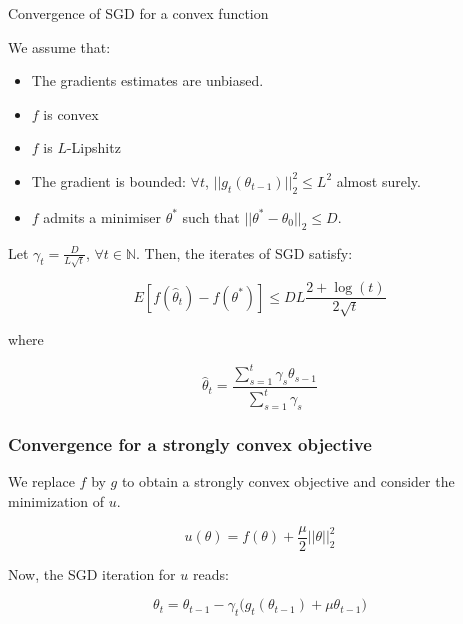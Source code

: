 \documentclass[
10pt, %
a4paper, %
oneside, %
headinclude,footinclude, %
BCOR5mm, %
]{scrartcl}
\begin{document}
\begin{theorem}{Convergence of SGD for a convex function}
    \label{th:sgdconvex}

    We assume that:
    \begin{itemize}
	\item The gradients estimates are unbiased.
        \item $f$ is convex
	\item $f$ is $L$-Lipshitz
	\item The gradient is bounded: $\forall t$, $||g_t(\theta_{t-1})||_2^2\leq L^2$ almost surely.
	\item $f$ admits a minimiser $ \theta^*$ such that $||\theta^*-\theta_0||_2\leq D$.
    \end{itemize}

    Let $\gamma_t = \frac{D}{L \sqrt{t} } $, $\forall t\in \mathbb{N} $. Then, the iterates of SGD satisfy:

    \begin{equation}
	E[f( \hat{\theta}_t)-f(\theta^*)]\leq DL \frac{2+\log(t)}{2 \sqrt{t} }
    \end{equation}

    where 

    \begin{equation}
	\hat{\theta}_t = \frac{ \sum^{t}_{s=1} \gamma_s\theta_{s-1}}{ \sum^{t}_{s=1} \gamma_s} 
    \end{equation}

\end{theorem}

\subsubsection{\large\color{Periwinkle}Convergence for a strongly convex objective}

We replace $f$ by $g$ to obtain a strongly convex objective and consider the minimization of $u$.

\begin{equation*}
    u(\theta) = f(\theta)+ \frac{\mu}{2} ||\theta||_2^2
\end{equation*}

Now, the SGD iteration for $u$ reads:

\begin{equation}
    \label{eq:udate}
    \theta_t = \theta_{t-1}- \gamma_t\big(g_t(\theta_{t-1})+\mu \theta_{t-1}\big)
\end{equation}
\end{document}

